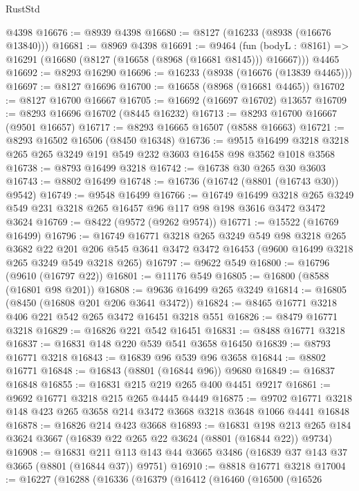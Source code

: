 \begin{lexlean}{RustStd}
\begin{coremodule}
    @4398
@16676 := @8939 @4398
@16680 := @8127 (@16233 (@8938 (@16676 @13840)))
@16681 := @8969 @4398
@16691 := @9464
    (fun (bodyL : @8161) => @16291 (@16680 (@8127 (@16658 (@8968 (@16681 @8145))) @16667)))
    @4465
@16692 := @8293 @16290
@16696 := @16233 (@8938 (@16676 (@13839 @4465)))
@16697 := @8127 @16696
@16700 := @16658 (@8968 (@16681 @4465))
@16702 := @8127 @16700 @16667
@16705 := @16692 (@16697 @16702) @13657
@16709 := @8293 @16696 @16702 (@8445 @16232)
@16713 := @8293 @16700 @16667 (@9501 @16657)
@16717 := @8293 @16665 @16507 (@8588 @16663)
@16721 := @8293 @16502 @16506 (@8450 @16348)
@16736 := @9515 @16499 @3218 @3218 @265 @265 @3249 @191 @549 @232 @3603 @16458 @98 @3562 @1018 @3568
@16738 := @8793 @16499 @3218
@16742 := @16738 @30 @265 @30 @3603
@16743 := @8802 @16499
@16748 := @16736 (@16742 (@8801 (@16743 @30)) @9542)
@16749 := @9548 @16499
@16766 := @16749
    @16499
    @3218
    @265
    @3249
    @549
    @231
    @3218
    @265
    @16457
    @96
    @117
    @98
    @198
    @3616
    @3472
    @3472
    @3624
@16769 := @8422 (@9572 (@9262 @9574))
@16771 := @15522 (@16769 @16499)
@16796 := @16749
    @16771
    @3218
    @265
    @3249
    @549
    @98
    @3218
    @265
    @3682
    @22
    @201
    @206
    @545
    @3641
    @3472
    @3472
    @16453
    (@9600 @16499 @3218 @265 @3249 @549 @3218 @265)
@16797 := @9622 @549
@16800 := @16796 (@9610 (@16797 @22))
@16801 := @11176 @549
@16805 := @16800 (@8588 (@16801 @98 @201))
@16808 := @9636 @16499 @265 @3249
@16814 := @16805 (@8450 (@16808 @201 @206 @3641 @3472))
@16824 := @8465 @16771 @3218 @406 @221 @542 @265 @3472 @16451 @3218 @551
@16826 := @8479 @16771 @3218
@16829 := @16826 @221 @542 @16451
@16831 := @8488 @16771 @3218
@16837 := @16831 @148 @220 @539 @541 @3658 @16450
@16839 := @8793 @16771 @3218
@16843 := @16839 @96 @539 @96 @3658
@16844 := @8802 @16771
@16848 := @16843 (@8801 (@16844 @96)) @9680
@16849 := @16837 @16848
@16855 := @16831 @215 @219 @265 @400 @4451 @9217
@16861 := @9692 @16771 @3218 @215 @265 @4445 @4449
@16875 := @9702 @16771 @3218 @148 @423 @265 @3658 @214 @3472 @3668 @3218 @3648 @1066 @4441 @16848
@16878 := @16826 @214 @423 @3668
@16893 := @16831
    @198
    @213
    @265
    @184
    @3624
    @3667
    (@16839 @22 @265 @22 @3624 (@8801 (@16844 @22)) @9734)
@16908 := @16831
    @211
    @113
    @143
    @44
    @3665
    @3486
    (@16839 @37 @143 @37 @3665 (@8801 (@16844 @37)) @9751)
@16910 := @8818 @16771 @3218
@17004 := @16227
    (@16288
      (@16336
        (@16379
          (@16412
            (@16460
              (@16500
                (@16526

\end{coremodule}
\end{lexlean}
